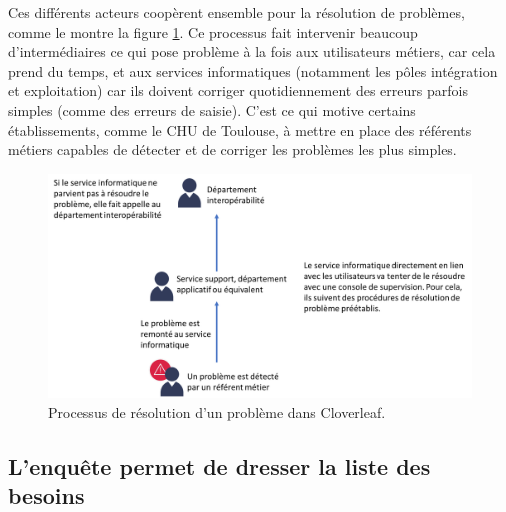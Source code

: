 			Ces différents acteurs coopèrent ensemble pour la résolution de problèmes,
			comme le montre la figure \ref{resolution_pbs}. Ce processus fait intervenir
			beaucoup d’intermédiaires ce qui pose problème à la fois aux utilisateurs métiers,
			car cela prend du temps, et aux services informatiques
			(notamment les pôles intégration et exploitation) car ils doivent corriger
			quotidiennement des erreurs parfois simples (comme des erreurs de saisie).
			C'est ce qui motive certains établissements, comme le CHU de
			Toulouse, à mettre en place des référents métiers capables de détecter et
			de corriger les problèmes les plus simples.
			\begin{figure}[H]
				\centering
				\includegraphics[width=15cm]{../img/user_1.png}
				\caption{\label{resolution_pbs} Processus de résolution d'un problème dans
				Cloverleaf.}
			\end{figure}
			
		\subsection{L'enquête permet de dresser la liste des besoins}
